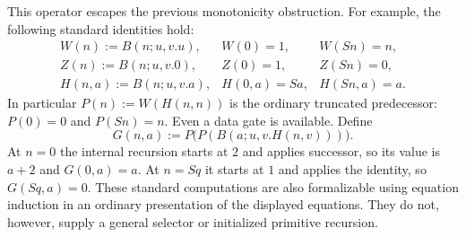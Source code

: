 \documentclass[11pt,letterpaper]{article}
\theoremstyle{definition}\newtheorem{definition}[theorem]{Definition}
\theoremstyle{remark}\newtheorem{remark}[theorem]{Remark}
\begin{document}
This operator escapes the previous monotonicity obstruction.
For example, the following standard identities hold:
\[
 \begin{array}{lll}
 W(n):=B(n;u,v.u),&W(0)=1,&W(Sn)=n,\\
 Z(n):=B(n;u,v.0),&Z(0)=1,&Z(Sn)=0,\\
 H(n,a):=B(n;u,v.a),&H(0,a)=Sa,&H(Sn,a)=a.
 \end{array}
\]
In particular $P(n):=W(H(n,n))$ is the ordinary truncated predecessor:
$P(0)=0$ and $P(Sn)=n$. Even a data gate is available. Define
\[
        G(n,a):=P\bigl(P(B(a;u,v.H(n,v)))\bigr).
\]
At $n=0$ the internal recursion starts at $2$ and applies successor,
so its value is $a+2$ and $G(0,a)=a$. At $n=Sq$ it starts at $1$
and applies the identity, so $G(Sq,a)=0$. These standard computations
are also formalizable using equation induction in an ordinary
presentation of the displayed equations. They do not, however, supply
a general selector or initialized primitive recursion.
\end{document}
